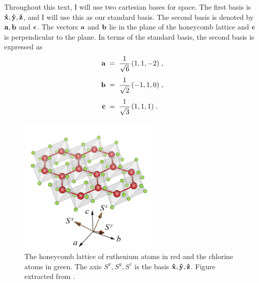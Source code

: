   

Throughout this text, I will use two cartesian bases for space.  The first basis is  $\bf{\hat{x}},\bf{\hat{y}},\bf{\hat{z}}$, and I will use this as our standard basis. The second basis is denoted by $\bf{a},\bf{b}$ and $\bf{c}$.  The vectors $\bf{a}$ and $\bf{b}$ lie in the plane of the honeycomb lattice and $\bf{c}$ is perpendicular to the plane. In terms of the standard basis, the second basis is expressed as 
\begin{align}
    \bf{a} \; &= \;%
    \frac{1}{\sqrt{6}} \, (1,1,-2) 
    \; , \\[4pt]    
    \bf{b} \; &= \;  \frac{1}{\sqrt{2}} \, (-1,1,0) \; , \\[4pt]
    \bf{c} \; &= \;  \frac{1}{\sqrt{3}} \, (1,1,1) \; .
\end{align}

\begin{figure}[h]
\centering
  \includegraphics[width= 0.6\textwidth]{images/CH3/Fig1.png}
  \caption{ The honeycomb lattice of ruthenium atoms in red and the chlorine atoms in green. The axis $S^x,S^y, S^z$ is the basis $\bf{\hat{x}},\bf{\hat{y}},\bf{\hat{z}}$. Figure extracted from \cite{yokoi2020halfinteger}.  }
  \label{fig:3-yokoi}
  \end{figure}
  
